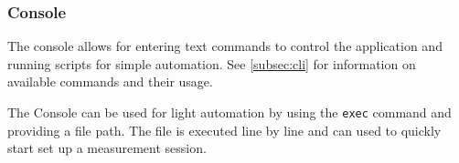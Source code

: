 \subsubsection{Console}
The console allows for entering text commands to control the application and running scripts for simple automation. See \autoref{subsec:cli} for information on available commands and their usage.

The Console can be used for light automation by using the \texttt{exec} command and providing a file path. The file is executed line by line and can used to quickly start set up a measurement session.